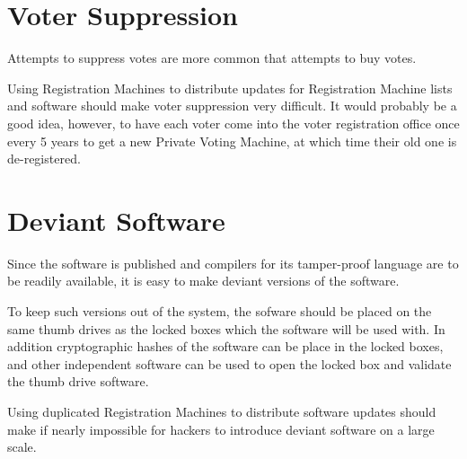 \documentclass[12pt]{article}
\begin{document}
\section{Voter Suppression}

Attempts to suppress votes are more common that attempts to buy votes.

Using Registration Machines to distribute updates for Registration
Machine lists and software should make voter suppression very difficult.
It would probably be a good idea, however, to have each voter come into
the voter registration office once every 5 years to get a new
Private Voting Machine, at which time their old one is de-registered.


\section{Deviant Software}
\label{DEVIANT-SOFTWARE}

Since the software is published and compilers for its tamper-proof
language are to be readily available, it is easy to make deviant
versions of the software.

To keep such versions out of the system, the sofware should be
placed on the same thumb drives as the locked boxes which the
software will be used with.  In addition cryptographic hashes of the
software can be place in the locked boxes, and other independent
software can be used to open the locked box and validate the
thumb drive software.

Using duplicated Registration Machines to distribute software updates should
make if nearly impossible for hackers
to introduce deviant software on a large scale.
\end{document}
